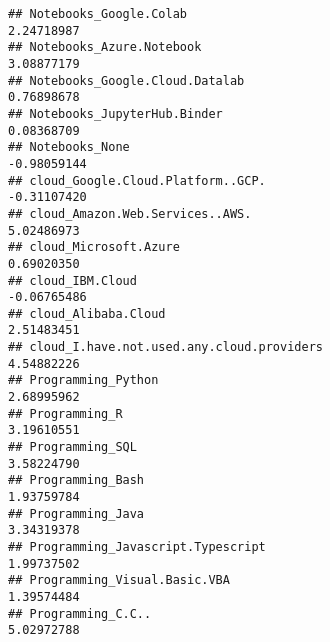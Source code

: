 \documentclass[
]{article}
\begin{document}
\begin{verbatim}
## Notebooks_Google.Colab                                                                                                       2.24718987
## Notebooks_Azure.Notebook                                                                                                     3.08877179
## Notebooks_Google.Cloud.Datalab                                                                                               0.76898678
## Notebooks_JupyterHub.Binder                                                                                                  0.08368709
## Notebooks_None                                                                                                              -0.98059144
## cloud_Google.Cloud.Platform..GCP.                                                                                           -0.31107420
## cloud_Amazon.Web.Services..AWS.                                                                                              5.02486973
## cloud_Microsoft.Azure                                                                                                        0.69020350
## cloud_IBM.Cloud                                                                                                             -0.06765486
## cloud_Alibaba.Cloud                                                                                                          2.51483451
## cloud_I.have.not.used.any.cloud.providers                                                                                    4.54882226
## Programming_Python                                                                                                           2.68995962
## Programming_R                                                                                                                3.19610551
## Programming_SQL                                                                                                              3.58224790
## Programming_Bash                                                                                                             1.93759784
## Programming_Java                                                                                                             3.34319378
## Programming_Javascript.Typescript                                                                                            1.99737502
## Programming_Visual.Basic.VBA                                                                                                 1.39574484
## Programming_C.C..                                                                                                            5.02972788

\end{verbatim}
\end{document}
